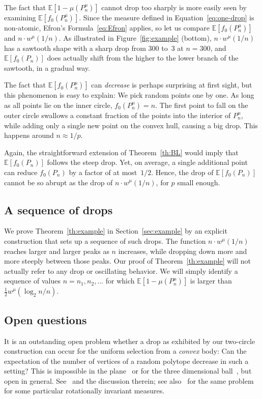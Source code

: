 \documentclass[10pt]{amsart}
\theoremstyle{definition}\newtheorem{defi}[theo]{Definition}\newtheorem{rema}[theo]{Remark}\newtheorem{exam}[theo]{Example}\newtheorem{exem}[theo]{Example}\newtheorem{nota}[theo]{Notation}
\newcommand{\Ebb}{\mathbb{E}}%
\newcommand{\ptb}[1]{\left[#1 \right]}
\begin{document}
The fact that $\Ebb[1-\mu(P_n^\mu)]$ {cannot} drop too sharply is more easily seen by examining $\Ebb\ptb{f_0(P_n^\mu)}$. Since the measure defined in Equation~\eqref{eq:one-drop} is non-atomic, Efron's Formula~\eqref{eq:Efron} applies, so let us compare $\Ebb\ptb{f_0(P_n^\mu)}$ and $n\cdot w^\mu(1/n)$. As illustrated in Figure~\ref{fig:example} (bottom), $n\cdot w^\mu(1/n)$ has a sawtooth shape with a sharp drop from 300 to~3 at $n=300$, and $\Ebb[f_0(P_n)]$ does actually shift from the higher to the lower branch of the sawtooth, in a gradual way.

The fact that $\Ebb[f_0(P_n^\mu)]$ can \emph{decrease} is perhaps surprising at first sight, but this phenomenon is easy to explain: We pick random points one by one. As long as all points lie on the inner circle, $f_0(P_n^\mu)=n$. The first point to fall on the outer circle swallows a constant fraction of the points into the interior of $P_n^\mu$, while adding only a single new point on the convex hull, causing a big drop. This happens around $n\approx 1/p$.


Again, the straightforward extension of Theorem~\ref{th:BL} would imply that $\Ebb[f_0(P_n)]$ follows the steep drop. Yet, on average, a single additional point can reduce $f_0(P_n)$ by {a factor} of at most~$1/2$. Hence, the drop of $\Ebb[f_0(P_n)]$ cannot be so abrupt as the drop of $n\cdot w^\mu(1/n)$, for $p$ small enough.



\subsection{A sequence of drops}

We prove Theorem~\ref{th:example} in Section~\ref{sec:example} by an explicit construction that sets up a sequence of such drops. The function $n\cdot w^\mu(1/n)$ reaches larger and larger peaks as $n$ increases, while dropping down more and more steeply between those peaks. Our proof of Theorem~\ref{th:example} will not actually refer to any drop or oscillating behavior. We will simply identify a sequence of values $n=n_1, n_2, \ldots$ for which $\Ebb[1-\mu(P_{n}^\mu)]$ is larger than $\frac12 w^\mu(\log_2 n/n)$.


\subsection{Open questions}

It is an outstanding open problem whether a drop as exhibited by our two-circle construction can occur for the uniform selection from a \emph{convex} body: Can the expectation of the number of vertices of a random polytope decrease in such a setting? This is impossible in the plane~\cite{DGG} or for the three dimensional ball~\cite{Beermann}, but open in general. See~\cite{BR} and the discussion therein; see also~\cite{KTZ} for the same problem for some particular rotationally invariant measures.
\end{document}
